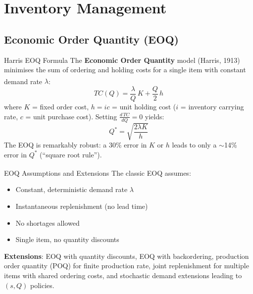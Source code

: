 \section{Inventory Management}

\subsection{Economic Order Quantity (EOQ)}


\begin{v3topic}{Harris EOQ Formula}
    The \textbf{Economic Order Quantity} model (Harris, 1913) minimises the sum of ordering and holding costs for a single item with constant demand rate $\lambda$\textsuperscript{\cite{harrisHowManyParts1913}}:
    \begin{equation}
        TC(Q) = \frac{\lambda}{Q}\,K + \frac{Q}{2}\,h
    \end{equation}
    where $K$ = fixed order cost, $h = ic$ = unit holding cost ($i$ = inventory carrying rate, $c$ = unit purchase cost).
    Setting $\frac{d\,TC}{dQ}=0$ yields:
    \begin{equation}
        Q^* = \sqrt{\frac{2\lambda K}{h}}
    \end{equation}
    The EOQ is remarkably robust: a 30\% error in $K$ or $h$ leads to only a $\sim$14\% error in $Q^*$ (``square root rule'').

\end{v3topic}
\begin{v3topic}{EOQ Assumptions and Extensions}
    The classic EOQ assumes\textsuperscript{\cite[][pp.~936--942]{hillierIntroductionOperationsResearch2020}}:
    \begin{itemize}
        \item Constant, deterministic demand rate $\lambda$
        \item Instantaneous replenishment (no lead time)
        \item No shortages allowed
        \item Single item, no quantity discounts
    \end{itemize}
    \textbf{Extensions}: EOQ with quantity discounts, EOQ with backordering, production order quantity (POQ) for finite production rate, joint replenishment for multiple items with shared ordering costs, and stochastic demand extensions leading to $(s,Q)$ policies.

\end{v3topic}

